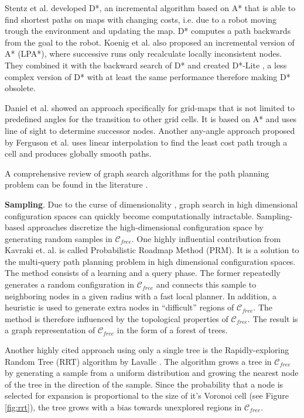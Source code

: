 \documentclass[11pt,twocolumn]{article}
\begin{document}
Stentz et al. developed D*, an incremental algorithm based on A* that
is able to find shortest paths on maps with changing costs, i.e. due
to a robot moving trough the environment and updating the map. D*
computes a path backwards from the goal to the robot. Koenig et
al. \cite{koenigIncremental2001} also proposed an incremental version
of A* (LPA*), where successive runs only recalculate locally
inconsistent nodes. They combined it with the backward search of D*
and created D*-Lite \cite{koenigLite2002}, a less complex version of
D* with at least the same performance therefore making D* obsolete.

Daniel et al. \cite{danielThetaAnyAnglePath2010} showed an approach
specifically for grid-maps that is not limited to predefined angles
for the transition to other grid cells. It is based on A* and uses
line of sight to determine successor nodes. Another any-angle approach
proposed by Ferguson et al.  \cite{fergusonFieldAlgorithmImproved2005}
uses linear interpolation to find the least cost path trough a cell
and produces globally smooth paths.

A comprehensive review of graph search algorithms for the path
planning problem can be found in the literature
\cite{aitsaadiUAVPathPlanning2022,sanchez-ibanezPathPlanningAutonomous2021,yanComprehensiveSurveyAnalysis2020,nashAnyAnglePathPlanning2013}.

\textbf{Sampling}. Due to the curse of dimensionality
\cite{bellmanDynamicProgramming1984}, graph search in high dimensional
configuration spaces can quickly become computationally intractable.
Sampling-based approaches discretize the high-dimensional
configuration space by generating random samples in
\(\mathcal{C}_{free}\). One highly influential contribution from
Kavraki et. al. \cite{kavrakiProbabilisticRoadmapsPath1996} is called
Probabilistic Roadmap Method (PRM). It is a solution to the
multi-query path planning problem in high dimensional configuration
spaces. The method consists of a learning and a query phase. The
former repeatedly generates a random configuration in
\(\mathcal{C}_{free}\) and connects this sample to neighboring nodes
in a given radius with a fast local planner. In addition, a heuristic
is used to generate extra nodes in ``difficult'' regions of
\(\mathcal{C}_{free}\). The method is therefore influenced by the
topological properties of \(\mathcal{C}_{free}\). The result is a
graph representation of \(\mathcal{C}_{free}\) in the form of a forest
of trees.

Another highly cited approach using only a single tree is the
Rapidly-exploring Random Tree (RRT) algorithm by Lavalle
\cite{lavalleRapidlyExploringRandomTrees1998}. The algorithm grows a
tree in \(\mathcal{C}_{free}\) by generating a sample from a uniform
distribution and growing the nearest node of the tree in the direction
of the sample. Since the probability that a node is selected for
expansion is proportional to the size of it's Voronoi cell (see Figure
\ref{fig:rrt}), the tree grows with a bias towards unexplored regions
in \(\mathcal{C}_{free}\).
\end{document}
